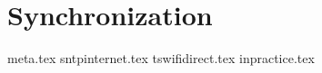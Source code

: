 \chapter{Synchronization}\label{cha:synchronization}
{meta.tex}
{sntpinternet.tex}
{tswifidirect.tex}
{inpractice.tex}

